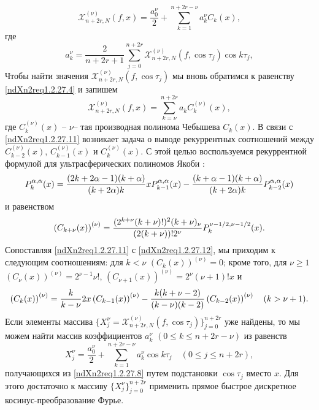 \begin{equation}\label{ndXn2req1.2.27.11}
\mathcal{X}^{(\nu)}_{n+2r,N}(f,x)=\frac{a^\nu_0}{2}+\sum_{k=1}^{n+2r-\nu}a^\nu_kC_k(x),
\end{equation}
где
\begin{equation}\label{ndXn2req1.2.27.12}
a^\nu_k =\frac{2}{n+2r+1}\sum_{j=0}^{n+2r}\mathcal{X}^{(\nu)}_{n+2r,N}(f,\cos\tau_j)\cos k\tau_j,
\end{equation}
Чтобы найти значения $\mathcal{X}^{(\nu)}_{n+2r,N}(f,\cos\tau_j)$ мы  вновь обратимся к равенству \eqref{ndXn2req1.2.27.4} и запишем
\begin{equation}\label{ndXn2req1.2.27.13}
\mathcal{X}^{(\nu)}_{n+2r,N}(f,x)=\sum_{k=\nu}^{n+2r}a_kC^{(\nu)}_k(x),
\end{equation}
где $C_k^{(\nu)}(x)$ -- $\nu$-- тая производная полинома Чебышева $C_k(x)$. В связи с \eqref{ndXn2req1.2.27.11} возникает задача о выводе рекуррентных соотношений между $C_{k-2}^{(\nu)}(x)$,  $C_{k-1}^{(\nu)}(x)$ и $C_k^{(\nu)}(x)$.
 С этой целью воспользуемся рекуррентной формулой для
ультрасферических полиномов Якоби \cite{idprm9}:
    \begin{equation}\label{ndXn2req1.2.27.14}
     P_k^{\alpha,\alpha}(x)=
     {(2k+2\alpha-1)(k+\alpha)\over(k+2\alpha)k}
     xP_{k-1}^{\alpha,\alpha}(x)-
{(k+\alpha-1)(k+\alpha)\over(k+2\alpha)k}
P_{k-2}^{\alpha,\alpha}(x)
     \end{equation}
   и  равенством
         \begin{equation}\label{ndXn2req1.2.27.15}
     \left(C_{k+\nu}(x)\right)^{(\nu)}=
     {(2^{k+\nu}(k+\nu)!)^2(k+\nu)_\nu\over (2(k+\nu))!2^\nu}
     P_k^{\nu-1/2,\nu-1/2}(x).
          \end{equation}
Сопоставляя \eqref{ndXn2req1.2.27.11} с \eqref{ndXn2req1.2.27.12}, мы приходим к следующим
соотношениям: для $k<\nu$ $\left(C_k(x)\right)^{(\nu)}=0$; кроме
того, для $\nu\ge1$ $\left(C_\nu(x)\right)^{(\nu)}=2^{\nu-1}\nu!$,
$\left(C_{\nu+1}(x)\right)^{(\nu)}=2^\nu(\nu+1)!x$ и
 \begin{equation}\label{ndXn2req1.2.27.16}
\left(C_k(x)\right)^{(\nu)}={k\over k-\nu}2x
\left(C_{k-1}(x)\right)^{(\nu)}-{k(k+\nu-2)\over
(k-\nu)(k-2)}\left(C_{k-2}(x)\right)^{(\nu)}\quad (k>\nu+1).
 \end{equation}
Если элементы массива $\{X^\nu_j=\mathcal{X}^{(\nu)}_{n+2r,N}(f,\cos\tau_j)\}_{j=0}^{n+2r}$ уже найдены, то мы можем найти массив  коэффициентов $a^\nu_k$ $(0\le k\le n+2r-\nu)$ из равенств
$$
X^\nu_j=\frac{a^\nu_0}{2}+\sum_{k=1}^{n+2r-\nu}a^\nu_k\cos k\tau_j \quad(0\le j\le n+2r),
$$
получающихся из \eqref{ndXn2req1.2.27.8} путем подстановки  $\cos\tau_j$ вместо $x$. Для этого достаточно к массиву $\{X^\nu_j\}_{j=0}^{n+2r}$ применить прямое быстрое дискретное косинус-преобразование Фурье.



